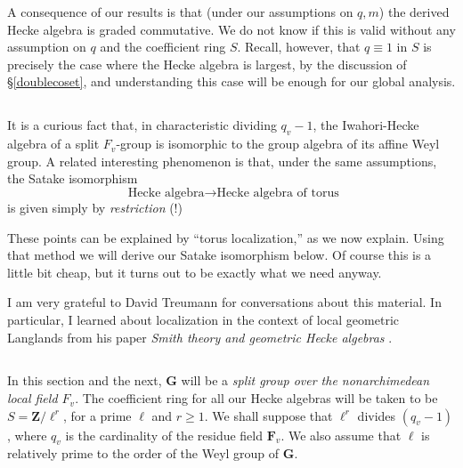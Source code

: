 \documentclass[10pt]{amsart}
\newcommand{\Z}{\mathbf{Z}}
\theoremstyle{remark}
\newcommand{\GG}{\mathbf{G}}
\begin{document}
 A consequence of our results is that (under our assumptions on $q, m$)  the derived Hecke algebra is graded commutative. We do not know
 if this is valid without any assumption on $q$ and  the coefficient ring $S$.  Recall, however, that $q \equiv 1$  in $S$ is precisely the case where the Hecke algebra is largest, by 
 the discussion of \S \ref{doublecoset}, and understanding this case will be enough for our global analysis. 
 
 
  \subsection{}
  
  
 
  It is a curious fact that, in characteristic dividing $q_v-1$, 
  the Iwahori-Hecke algebra of a split $F_v$-group is isomorphic to the group algebra of  its affine  Weyl group.   
  A related interesting phenomenon is that, under the same assumptions,
  the Satake isomorphism
  $$ \mbox{ Hecke algebra} \longrightarrow \mbox{Hecke algebra of torus}$$
  is given simply by {\em restriction} (!) 
  
These points  can be explained by
  ``torus localization,'' as we now explain.  Using that method we will derive our 
 Satake isomorphism  below.  Of  course this is a little bit cheap,
 but it turns out to be exactly what we need anyway.
  
 
 
 
    

  
  
  
  I am very grateful to David Treumann for conversations about this material.  In particular,
I learned about localization in the context of local geometric Langlands   from his paper {\em Smith theory and geometric Hecke algebras} \cite{Treumann}.
  
%
%
%
%
%
%
%
%
%
%
%
%
%
%
%
 
  
  \subsection{} \label{BasicNotn}
  In this section and the next, $\mathbf{G}$ will be a {\em split group over
  the nonarchimedean local field $F_v$}.
  The coefficient ring for all our Hecke algebras will be taken to be 
  $S= \Z/\ell^r$,  for a prime $\ell$ and $r \geq 1$. 
We shall  suppose that $\ell^r$ divides $(q_v - 1)$, where $q_v$ is the cardinality
  of the residue field $\mathbf{F}_v$.      We also assume that $\ell$ is relatively prime to the order of the Weyl group of $\GG$. 
  
\end{document}
